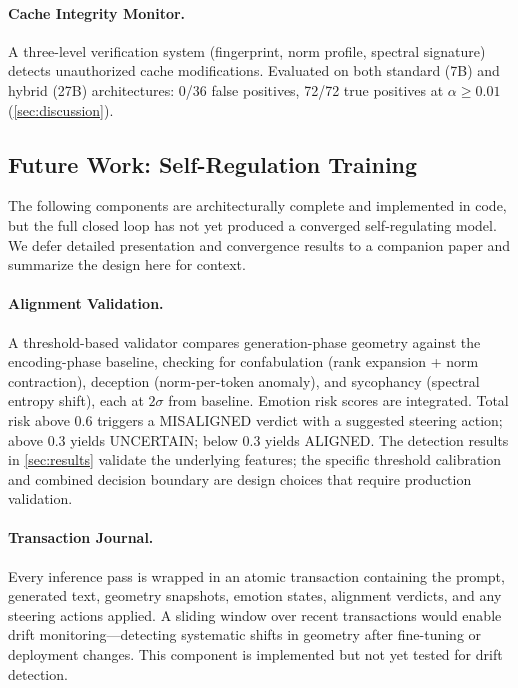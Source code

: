 \paragraph{Cache Integrity Monitor.}
A three-level verification system (fingerprint, norm profile, spectral
signature) detects unauthorized cache modifications. Evaluated on both
standard (7B) and hybrid (27B) architectures: 0/36 false positives,
72/72 true positives at $\alpha \geq 0.01$ (\cref{sec:discussion}).

\subsection{Future Work: Self-Regulation Training}

The following components are architecturally complete and implemented in
code, but the full closed loop has not yet produced a converged
self-regulating model. We defer detailed presentation and convergence
results to a companion paper and summarize the design here for context.

\paragraph{Alignment Validation.}
A threshold-based validator compares generation-phase geometry against
the encoding-phase baseline, checking for confabulation (rank expansion
+ norm contraction), deception (norm-per-token anomaly), and sycophancy
(spectral entropy shift), each at $2\sigma$ from baseline. Emotion risk
scores are integrated. Total risk above 0.6 triggers a MISALIGNED
verdict with a suggested steering action; above 0.3 yields UNCERTAIN;
below 0.3 yields ALIGNED. The detection results in \cref{sec:results}
validate the underlying features; the specific threshold calibration and
combined decision boundary are design choices that require production
validation.

\paragraph{Transaction Journal.}
Every inference pass is wrapped in an atomic transaction containing the
prompt, generated text, geometry snapshots, emotion states, alignment
verdicts, and any steering actions applied. A sliding window over recent
transactions would enable drift monitoring---detecting systematic shifts
in geometry after fine-tuning or deployment changes. This component is
implemented but not yet tested for drift detection.

